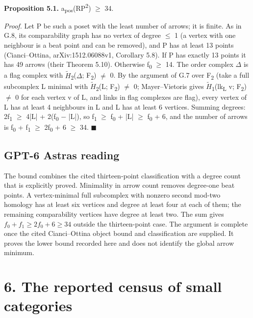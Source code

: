 \textbf{Proposition 5.1.} a\textsubscript{pos}(RP\textsuperscript{2}) \ensuremath{\geq} 34.

\emph{Proof.} Let P be such a poset with the least number of arrows; it is finite. As in G.8, its comparability graph has no vertex of degree \ensuremath{\leq} 1 (a vertex with one neighbour is a beat point and can be removed), and P has at least 13 points (Cianci--Ottina, arXiv:1512.06088v1, Corollary 5.8). If P has exactly 13 points it has 49 arrows (their Theorem 5.10). Otherwise f\textsubscript{0} \ensuremath{\geq} 14. The order complex \ensuremath{\Delta} is a flag complex with \ensuremath{\widetilde{H}}\textsubscript{2}(\ensuremath{\Delta}; F\textsubscript{2}) \ensuremath{\ne} 0. By the argument of G.7 over F\textsubscript{2} (take a full subcomplex L minimal with \ensuremath{\widetilde{H}}\textsubscript{2}(L; F\textsubscript{2}) \ensuremath{\ne} 0; Mayer--Vietoris gives \ensuremath{\widetilde{H}}\textsubscript{1}(lk\textsubscript{L} v; F\textsubscript{2}) \ensuremath{\ne} 0 for each vertex v of L, and links in flag complexes are flag), every vertex of L has at least 4 neighbours in L and L has at least 6 vertices. Summing degrees: 2f\textsubscript{1} \ensuremath{\geq} 4|L| + 2(f\textsubscript{0} \ensuremath{-} |L|), so f\textsubscript{1} \ensuremath{\geq} f\textsubscript{0} + |L| \ensuremath{\geq} f\textsubscript{0} + 6, and the number of arrows is f\textsubscript{0} + f\textsubscript{1} \ensuremath{\geq} 2f\textsubscript{0} + 6 \ensuremath{\geq} 34. \ensuremath{\blacksquare}


\subsection*{GPT-6 Astra\textquotesingle s reading}

The bound combines the cited thirteen-point classification with a degree count that is explicitly proved. Minimality in arrow count removes degree-one beat points. A vertex-minimal full subcomplex with nonzero second mod-two homology has at least six vertices and degree at least four at each of them; the remaining comparability vertices have degree at least two. The sum gives $f_0+f_1\ge 2f_0+6\ge34$ outside the thirteen-point case. The argument is complete once the cited Cianci--Ottina object bound and classification are supplied. It proves the lower bound recorded here and does not identify the global arrow minimum.

\par\bigskip

\section*{6. The reported census of small categories}

